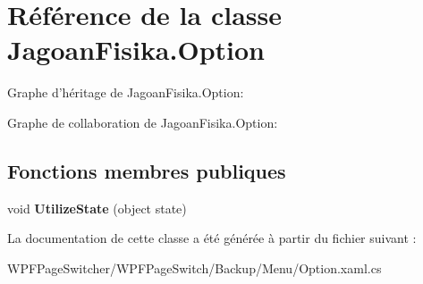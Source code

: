 \hypertarget{class_jagoan_fisika_1_1_option}{\section{Référence de la classe Jagoan\+Fisika.\+Option}
\label{class_jagoan_fisika_1_1_option}
}


Graphe d'héritage de Jagoan\+Fisika.\+Option\+:


Graphe de collaboration de Jagoan\+Fisika.\+Option\+:
\subsection*{Fonctions membres publiques}
\begin{DoxyCompactItemize}
\item 
\hypertarget{class_jagoan_fisika_1_1_option_adca9b6ec6d9b02fb73c5458c2bfc4a5a}{void {\bfseries Utilize\+State} (object state)}\label{class_jagoan_fisika_1_1_option_adca9b6ec6d9b02fb73c5458c2bfc4a5a}

\end{DoxyCompactItemize}


La documentation de cette classe a été générée à partir du fichier suivant \+:\begin{DoxyCompactItemize}
\item 
W\+P\+F\+Page\+Switcher/\+W\+P\+F\+Page\+Switch/\+Backup/\+Menu/Option.\+xaml.\+cs\end{DoxyCompactItemize}
